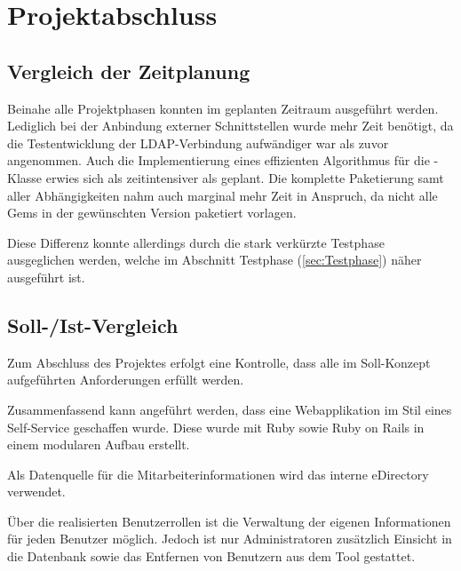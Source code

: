 \section{Projektabschluss}
\label{sec:Projektabschluss}

\subsection{Vergleich der Zeitplanung}
\label{sec:Vergleich der Zeitplanung}

Beinahe alle Projektphasen konnten im geplanten Zeitraum ausgeführt werden. Lediglich bei
der Anbindung externer Schnittstellen wurde mehr Zeit benötigt, da die Testentwicklung der
\acs{LDAP}-Verbindung aufwändiger war als zuvor angenommen. Auch die Implementierung eines
effizienten Algorithmus für die -Klasse erwies sich als zeitintensiver als geplant.
Die komplette Paketierung samt aller Abhängigkeiten nahm auch marginal mehr Zeit in Anspruch, da
nicht alle Gems in der gewünschten Version paketiert vorlagen.

Diese Differenz konnte allerdings durch die stark verkürzte Testphase ausgeglichen werden, welche im
Abschnitt Testphase (\Vgl \ref{sec:Testphase}) näher ausgeführt ist.

\pagebreak

\subsection{Soll-/Ist-Vergleich}
\label{sec:SollIstVergleich}
Zum Abschluss des Projektes erfolgt eine Kontrolle, dass alle im Soll-Konzept aufgeführten
Anforderungen erfüllt werden.

Zusammenfassend kann angeführt werden, dass eine Webapplikation im Stil eines Self-Service
geschaffen wurde. Diese wurde mit Ruby sowie Ruby on Rails in einem modularen Aufbau erstellt.

Als Datenquelle für die Mitarbeiterinformationen wird das interne eDirectory verwendet.

Über die realisierten Benutzerrollen ist die Verwaltung der eigenen Informationen für jeden Benutzer
möglich. Jedoch ist nur Administratoren zusätzlich Einsicht in die Datenbank sowie das Entfernen von
Benutzern aus dem Tool gestattet.


